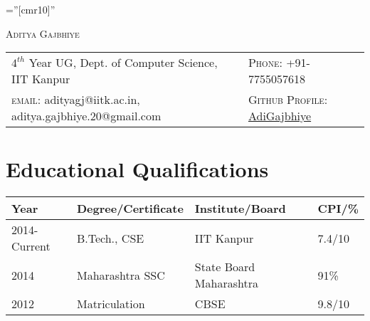 \documentclass{article}
\begin{document}
\pagestyle{empty} %

\font\fb=''[cmr10]'' %

\par{
		{\Huge  \textsc{Aditya Gajbhiye}
	}\par}

\begin{tabularx}{\textwidth}{Xl}
    $4^{th}$ Year UG, Dept. of Computer Science, IIT Kanpur &
    \textsc{Phone:}     +91-7755057618\\
    \textsc{email:}     adityagj@iitk.ac.in, aditya.gajbhiye.20@gmail.com  &
    \textsc{Github Profile:}   \href{https://github.com/adigajbhiye}{AdiGajbhiye}\\
\end{tabularx}
\vspace{-5mm}
\section{Educational Qualifications}
\centering
\begin{tabularx}{\textwidth}{|X|X|X|l|}
\hline
\rowcolor[HTML]{C0C0C0} 
\hline
\textbf{Year} & \textbf{Degree/Certificate} & \textbf{Institute/Board} & \textbf{CPI/\%} \\ \hline
2014-Current  & B.Tech., CSE                & IIT Kanpur               & 7.4/10          \\ \hline
2014          & Maharashtra SSC                      & State Board Maharashtra  & 91\%          \\ \hline
2012          & Matriculation               & CBSE                     & 9.8/10          \\ \hline
\end{tabularx}
\vspace{-2mm}
\end{document}

